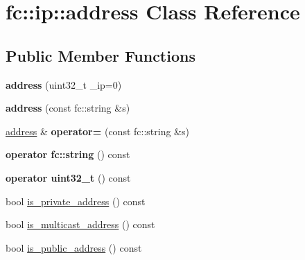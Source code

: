 \hypertarget{classfc_1_1ip_1_1address}{}\section{fc\+:\+:ip\+:\+:address Class Reference}
\label{classfc_1_1ip_1_1address}
\subsection*{Public Member Functions}
\begin{DoxyCompactItemize}
\item 
\mbox{\label{classfc_1_1ip_1_1address_aebc2d2f9bc831e6ad04399c9bd8406db}} 
{\bfseries address} (uint32\+\_\+t \+\_\+ip=0)
\item 
\mbox{\label{classfc_1_1ip_1_1address_a0992b23a0e958965171d03bccccedd3b}} 
{\bfseries address} (const fc\+::string \&s)
\item 
\mbox{\label{classfc_1_1ip_1_1address_a0560e2011b284ee0ae6d3f8b3b98cba8}} 
\mbox{\hyperlink{classfc_1_1ip_1_1address}{address}} \& {\bfseries operator=} (const fc\+::string \&s)
\item 
\mbox{\label{classfc_1_1ip_1_1address_a5f8c78759a8f7ce9a02215ebeb71d24c}} 
{\bfseries operator fc\+::string} () const
\item 
\mbox{\label{classfc_1_1ip_1_1address_a705d307a09a6f079579933fa1cf54cdb}} 
{\bfseries operator uint32\+\_\+t} () const
\item 
bool \mbox{\hyperlink{classfc_1_1ip_1_1address_a0fd7da64e9de2fc54b5dc537dad7aee2}{is\+\_\+private\+\_\+address}} () const
\item 
bool \mbox{\hyperlink{classfc_1_1ip_1_1address_a7365faef59d2df42310b3d68f62f61e4}{is\+\_\+multicast\+\_\+address}} () const
\item 
bool \mbox{\hyperlink{classfc_1_1ip_1_1address_a1481a21df38961dfc3c7eea41b1f79a7}{is\+\_\+public\+\_\+address}} () const
\end{DoxyCompactItemize}
